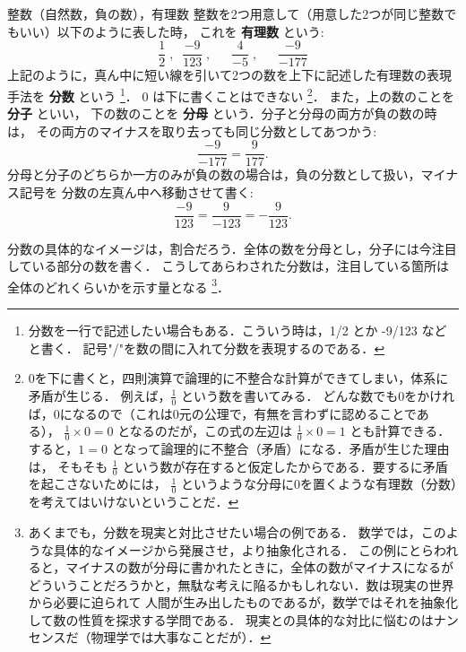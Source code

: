 \begin{mysmallsec}{整数（自然数，負の数），有理数}
            整数を2つ用意して（用意した2つが同じ整数でもいい）以下のように表した時，
            これを \textbf{有理数} という:
                \begin{equation*}
                    \frac{1}{2} \;,\;\; \frac{-9}{123} \;,\;\; \quad \frac{4}{-5} \;,\;\; \quad \frac{-9}{-177}
                \end{equation*}
            上記のように，真ん中に短い線を引いて2つの数を上下に記述した有理数の表現手法を \textbf{分数} という
                \footnote{
                    分数を一行で記述したい場合もある．こういう時は，1/2 とか -9/123 などと書く．
                    記号"/"を数の間に入れて分数を表現するのである．
                }．
            0 は下に書くことはできない
                \footnote{
                    0を下に書くと，四則演算で論理的に不整合な計算ができてしまい，体系に矛盾が生じる．
                    例えば，$\frac{1}{0}$ という数を書いてみる．
                    どんな数でも0をかければ，0になるので（これは0元の公理で，有無を言わずに認めることである），
                    $\frac{1}{0} \times 0 = 0$ となるのだが，この式の左辺は $\frac{1}{0} \times 0 = 1$ とも計算できる．
                    すると，$1=0$ となって論理的に不整合（矛盾）になる．矛盾が生じた理由は，
                    そもそも $\frac{1}{0}$ という数が存在すると仮定したからである．要するに矛盾を起こさないためには，
                    $\frac{1}{0}$ というような分母に0を置くような有理数（分数）を考えてはいけないということだ．
                }．
            また，上の数のことを \textbf{分子} といい，
            下の数のことを \textbf{分母} という．分子と分母の両方が負の数の時は，
            その両方のマイナスを取り去っても同じ分数としてあつかう:
                \begin{equation*}
                    \frac{-9}{-177} = \frac{9}{177}.
                \end{equation*}
            分母と分子のどちらか一方のみが負の数の場合は，負の分数として扱い，マイナス記号を
            分数の左真ん中へ移動させて書く:
                \begin{equation*}
                    \frac{-9}{123} = \frac{9}{-123} = -\frac{9}{123}.
                \end{equation*}

            分数の具体的なイメージは，割合だろう．全体の数を分母とし，分子には今注目している部分の数を書く．
            こうしてあらわされた分数は，注目している箇所は全体のどれくらいかを示す量となる
                \footnote{
                    あくまでも，分数を現実と対比させたい場合の例である．
                    数学では，このような具体的なイメージから発展させ，より抽象化される．
                    この例にとらわれると，マイナスの数が分母に書かれたときに，全体の数がマイナスになるが
                    どういうことだろうかと，無駄な考えに陥るかもしれない．数は現実の世界から必要に迫られて
                    人間が生み出したものであるが，数学ではそれを抽象化して数の性質を探求する学問である．
                    現実との具体的な対比に悩むのはナンセンスだ（物理学では大事なことだが）．
                }．
        \end{mysmallsec}

